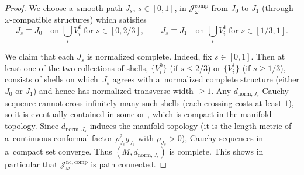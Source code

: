 \documentclass[pdftex]{sigma}
\numberwithin{equation}{section}
\theoremstyle{definition}
\begin{document}
\begin{proof}
We choose a~smooth path $J_s$, $s\in[0,1]$, in $\mathcal{J}^{\mathrm{comp}}_\omega$ from $J_0$ to $J_1$ (through $\omega$-compatible structures) which satisfies
\[
J_s\equiv J_0\quad \text{on }\bigcup_i V_i^0\ \text{for }s\in[0,2/3],
\qquad
J_s\equiv J_1\quad \text{on }\bigcup_i V_i^1\ \text{for }s\in[1/3,1].
\]


We claim that each $J_s$ is normalized complete.
Indeed, fix $s\in[0,1]$. Then at least one of the two collections of shells,
$\big\{V_i^0\big\}$ (if $s\le 2/3$) or $\big\{V_i^1\big\}$ (if $s\ge 1/3$),
consists of shells on which~$J_s$ agrees with a~normalized complete structure (either $J_0$ or $J_1$) and hence has normalized transverse width $\ge 1$.
Any $d_{\mathrm{norm},J_s}$-Cauchy sequence cannot cross infinitely many such shells (each crossing costs at least $1$), so it is eventually contained in some  or , which is compact in the manifold topology.
Since $d_{\mathrm{norm},J_s}$ induces the manifold topology (it is the length metric of a~continuous conformal factor $\rho_{J_s}^{2}g_{J_s}$ with $\rho_{J_s}>0$), Cauchy sequences in a~compact set converge.
Thus $(M,d_{\mathrm{norm},J_s})$ is complete.
This shows in particular that $\mathcal{J}^{\mathrm{nc,comp}}_\omega$ is path connected.
\end{proof}
\end{document}
